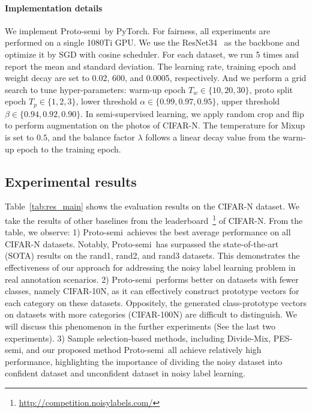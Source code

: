 \documentclass[letterpaper]{article} %
\newcommand{\method}{Proto-semi}
\begin{document}
\paragraph{Implementation details}
We implement \method\ by PyTorch. For fairness, all experiments are performed on a single 1080Ti GPU. We use the ResNet34~\cite{DBLP:conf/cvpr/HeZRS16} as the backbone and optimize it by SGD with cosine scheduler. 
For each dataset, we run 5 times and report the mean and standard deviation. The learning rate, training epoch and weight decay are set to 0.02, 600, and 0.0005, respectively. And we perform a grid search to tune hyper-parameters: warm-up epoch $T_w \in \{10, 20, 30\}$, proto split epoch $T_p \in \{1, 2, 3\}$, lower threshold $\alpha \in \{0.99, 0.97, 0.95\}$, upper threshold $\beta \in \{0.94, 0.92, 0.90\}$. In semi-supervised learning, we apply random crop and flip to perform augmentation on the photos of CIFAR-N. The temperature for Mixup is set to $0.5$, and the balance factor $\lambda$ follows a linear decay value from the warm-up epoch to the training epoch.



\subsection{Experimental results}
Table~\ref{tab:res_main} shows the evaluation results on the CIFAR-N dataset. We take the results of other baselines from the leaderboard~\footnote{\url{http://competition.noisylabels.com/}} of CIFAR-N.
From the table, we observe: 1) \method\ achieves the best average performance on all CIFAR-N datasets. Notably, \method\ has surpassed the state-of-the-art (SOTA) results on the rand1, rand2, and rand3 datasets. This demonstrates the effectiveness of our approach for addressing the noisy label learning problem in real annotation scenarios. 
2) \method\ performs better on datasets with fewer classes, namely CIFAR-10N, as it can effectively construct prototype vectors for each category on these datasets.
Oppositely, the generated class-prototype vectors on datasets with more categories (CIFAR-100N) are difficult to distinguish. We will discuss this phenomenon in the further experiments (See the last two experiments). 
3) Sample selection-based methods, including Divide-Mix, PES-semi, and our proposed method \method\ all achieve relatively high performance, highlighting the importance of dividing the noisy dataset into confident dataset and unconfident dataset in noisy label learning.
\end{document}
